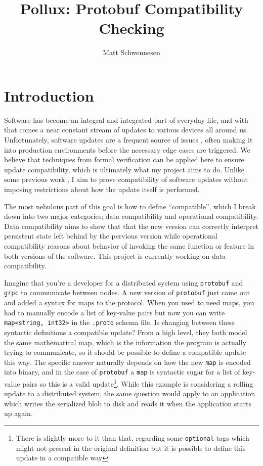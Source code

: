 \documentclass[11pt]{article}
\author{Matt Schwennesen}
\title{Pollux: Protobuf Compatibility Checking}
\date{}
\theoremstyle{definition}
\begin{document}
\maketitle
\tableofcontents

\section{Introduction}

Software has become an integral and integrated part of everyday life, and with
that comes a near constant stream of updates to various devices all around
us. Unfortunately, software updates are a frequent source of issues
\autocites{zhangUnderstandingDetectingSoftware2021}[][]{Gray1986WhyDC}, often
making it into production environments before the necessary edge cases are
triggered. We believe that techniques from formal verification can be applied
here to ensure update compatibility, which is ultimately what my project aims to
do. Unlike some previous work
\autocites{ajmaniModularSoftwareUpgrades2006}[][]{reitblattAbstractionsNetworkUpdate2012},
I aim to prove compatibility of software updates without imposing restrictions
about how the update itself is performed.

The most nebulous part of this goal is how to define ``compatible'', which I
break down into two major categories; data compatibility and operational
compatibility. Data compatibility aims to show that that the new version can
correctly interpret persistent state left behind by the pervious version while
operational compatibility reasons about behavior of invoking the same function
or feature in both versions of the software. This project is currently working
on data compatibility.

Imagine that you're a developer for a distributed system using \texttt{protobuf}
and \texttt{grpc} to communicate between nodes. A new version of
\texttt{protobuf} just came out and added a syntax for maps to the
protocol. When you used to need maps, you had to manually encode a list of
key-value pairs but now you can write \texttt{map<string, int32>} in the
\texttt{.proto} schema file. Is changing between these syntactic definitions a
compatible update? From a high level, they both model the same mathematical map,
which is the information the program is actually trying to communicate, so it
should be possible to define a compatible update this way. The specific answer
naturally depends on how the new \texttt{map} is encoded into binary, and in the
case of \texttt{protobuf} a \texttt{map} is syntactic sugar for a list of
key-value pairs so this is a valid update\footnote{There is slightly more to it
	than that, regarding some \texttt{optional} tags which might not present in
	the original definition but it is possible to define this update in a
	compatible way}. While this example is considering a rolling update to a
distributed system, the same question would apply to an application which writes
the serialized blob to disk and reads it when the application starts up again.
\end{document}
